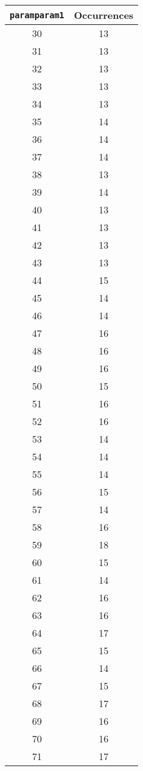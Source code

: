 \documentclass[letterpaper, 12pt]{article}
\begin{document}
\begin{longtable}{|c|c|}
\hline
\textbf{\texttt{paramparam1}} & \textbf{Occurrences} \\
\hline
30 & 13 \\
\hline
31 & 13 \\
\hline
32 & 13 \\
\hline
33 & 13 \\
\hline
34 & 13 \\
\hline
35 & 14 \\
\hline
36 & 14 \\
\hline
37 & 14 \\
\hline
38 & 13 \\
\hline
39 & 14 \\
\hline
40 & 13 \\
\hline
41 & 13 \\
\hline
42 & 13 \\
\hline
43 & 13 \\
\hline
44 & 15 \\
\hline
45 & 14 \\
\hline
46 & 14 \\
\hline
47 & 16 \\
\hline
48 & 16 \\
\hline
49 & 16 \\
\hline
50 & 15 \\
\hline
51 & 16 \\
\hline
52 & 16 \\
\hline
53 & 14 \\
\hline
54 & 14 \\
\hline
55 & 14 \\
\hline
56 & 15 \\
\hline
57 & 14 \\
\hline
58 & 16 \\
\hline
59 & 18 \\
\hline
60 & 15 \\
\hline
61 & 14 \\
\hline
62 & 16 \\
\hline
63 & 16 \\
\hline
64 & 17 \\
\hline
65 & 15 \\
\hline
66 & 14 \\
\hline
67 & 15 \\
\hline
68 & 17 \\
\hline
69 & 16 \\
\hline
70 & 16 \\
\hline
71 & 17 \\

\end{longtable}
\end{document}
